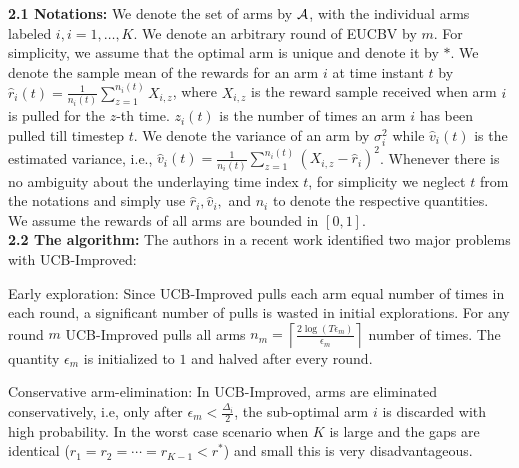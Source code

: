 \textbf{2.1 Notations:} We denote the set of arms by $\mathcal{A}$, with the individual arms labeled $i, i=1,\ldots,K$. We denote an arbitrary round of EUCBV by $m$. For simplicity, we assume that the optimal arm is unique and denote it by ${*}$. We denote the sample mean of the rewards for an arm $i$ at time instant $t$ by $\hat{r}_{i}(t)=\frac{1}{n_{i}(t)}\sum_{z=1}^{n_i(t)} X_{i,z}$, where $X_{i,z}$ is the reward sample received when arm $i$ is pulled for the $z$-th time. $z_i(t)$ is the number of times an arm $i$ has been pulled till timestep $t$. We denote the variance of an arm by $\sigma_i^{2}$ while $\hat{v}_{i}(t)$ is the estimated variance, i.e., $\hat{v}_{i}(t)=\frac{1}{n_i(t)}\sum_{z=1}^{n_{i}(t)}(X_{i,z}-\hat{r}_{i})^{2}$. Whenever there is no ambiguity about the underlaying  time index $t$, for simplicity we neglect $t$ from the notations and simply use  $\hat{r}_i, \hat{v}_i,$ and $n_i$ to denote the respective quantities. We assume the rewards of all arms are bounded in $[0,1]$.\\
\textbf{2.2 The algorithm:} The authors in a recent work \cite{liu2016modification} identified two major problems with UCB-Improved: 	\\
\begin{inparaenum}[\bfseries(i)]
\item Early exploration: Since UCB-Improved pulls each arm equal number of times in each round, a significant number of pulls is wasted in initial explorations. For any round $m$ UCB-Improved pulls all arms $n_{m}=\left\lceil \frac{ 2\log(T\epsilon_{m})}{\epsilon_{m}} \right\rceil$ number of times. The quantity $\epsilon_{m}$ is initialized to $1$ and halved after every round.\\
\item Conservative arm-elimination: In UCB-Improved, arms are eliminated conservatively, i.e, only after $\epsilon_{m}<\frac{\Delta_{i}}{2}$, the sub-optimal arm $i$ is discarded with high probability. In the worst case scenario when $K$ is large and the gaps are identical ($r_{1}=r_{2}=\cdots=r_{K-1}<r^{*}$) and small this is very disadvantageous.\\
\end{inparaenum}

